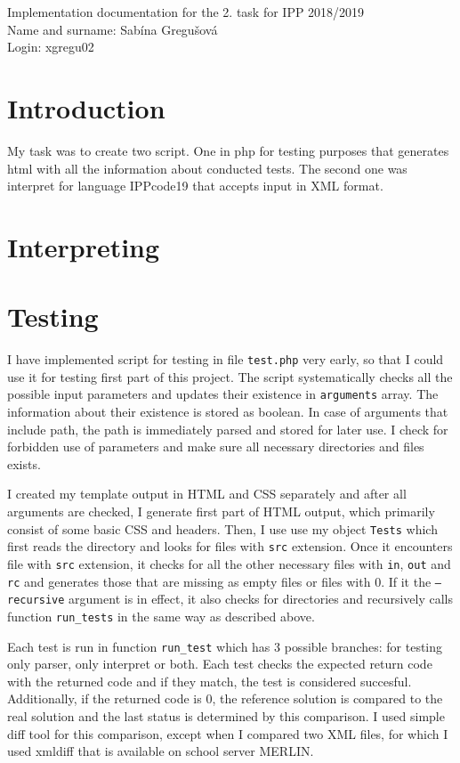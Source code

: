 \documentclass[10pt, a4paper]{article}
\begin{document}
\begin{center}
Implementation documentation for the 2. task for IPP 2018/2019\\
Name and surname: Sabína Gregušová\\
Login: xgregu02
\end{center}

\section{Introduction}
My task was to create two script. One in php for testing purposes that generates html with all the information about conducted tests. The second one was interpret for language IPPcode19 that accepts input in XML format.


\section{Interpreting}

\section{Testing}
I have implemented script for testing in file \texttt{test.php} very early, so that I could use it for testing first part of this project. The script systematically checks all the possible input parameters and updates their existence in \texttt{arguments} array. The information about their existence is stored as boolean. In case of arguments that include path, the path is immediately parsed and stored for later use. I check for forbidden use of parameters and make sure all necessary directories and files exists. 
\newline

I created my template output in HTML and CSS separately and after all arguments are checked, I generate first part of HTML output, which primarily consist of some basic CSS and headers. Then, I use use my object \texttt{Tests} which first reads the directory and looks for files with \texttt{src} extension. Once it encounters file with \texttt{src} extension, it checks for all the other necessary files with \texttt{in}, \texttt{out} and \texttt{rc} and generates those that are missing as empty files or files with 0.
If it the \texttt{--recursive} argument is in effect, it also checks for directories and recursively calls function \texttt{run\_tests} in the same way as described above.
\newline

Each test is run in function \texttt{run\_test} which has 3 possible branches: for testing only parser, only interpret or both. Each test checks the expected return code with the returned code and if they match, the test is considered succesful. Additionally, if the returned code is 0, the reference solution is compared to the real solution and the last status is determined by this comparison. I used simple diff tool for this comparison, except when I compared two XML files, for which I used xmldiff that is available on school server MERLIN.
\newline
\end{document}
